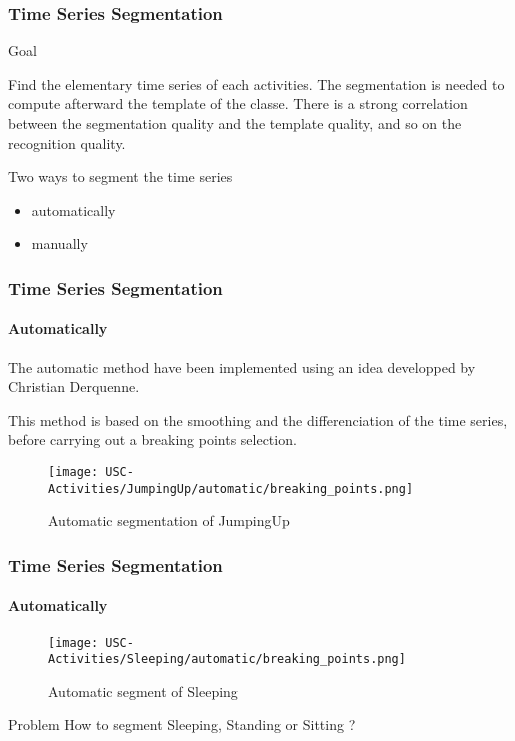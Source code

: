\documentclass[11pt, sans, handout]{beamer}
\begin{document}
\begin{frame}
	\frametitle{Time Series Segmentation}
	 
	 \begin{alertblock}{Goal}

		Find the elementary time series of each activities. The segmentation is needed to compute afterward the template of the classe. There is a strong correlation between the segmentation quality and the template quality, and so on the recognition quality.

	\end{alertblock}
	
	\begin{block}{Two ways to segment the time series}
	\begin{itemize}
		\item automatically
		\item manually
	\end{itemize}
	\end{block}

\end{frame}

\begin{frame}
	\frametitle{Time Series Segmentation}
	\framesubtitle{Automatically}
	
	The automatic method have been implemented using an idea developped by Christian Derquenne\cite{derquenne}. 
	
	This method is based on the smoothing and the differenciation of the time series, before carrying out a breaking points selection.	
	
	\begin{figure}
	\texttt{[image: USC-Activities/JumpingUp/automatic/breaking\_points.png]}
	\caption{Automatic segmentation of JumpingUp}
	\end{figure}

\end{frame}

\begin{frame}
	\frametitle{Time Series Segmentation}
	\framesubtitle{Automatically}
	
	\begin{figure}
	\texttt{[image: USC-Activities/Sleeping/automatic/breaking\_points.png]}
	\caption{Automatic segment of Sleeping}
	\end{figure}
	
	\begin{exampleblock}{Problem}
	How to segment Sleeping, Standing or Sitting ?
	\end{exampleblock}
	
\end{frame}
\end{document}
